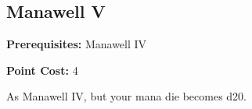 \subsection*{Manawell V}\label{feat:manawell5}

\noindent
\textbf{Prerequisites:} Manawell IV

\noindent
\textbf{Point Cost:} 4 

As Manawell IV, but your mana die becomes d20.

